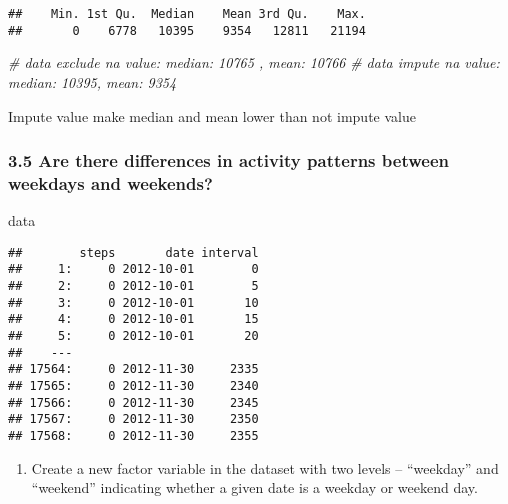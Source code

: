 \documentclass[
]{article}
\newenvironment{Shaded}{\begin{snugshade}}{\end{snugshade}}
\newcommand{\CommentTok}[1]{\textcolor[rgb]{0.56,0.35,0.01}{\textit{#1}}}
\newcommand{\KeywordTok}[1]{\textcolor[rgb]{0.13,0.29,0.53}{\textbf{#1}}}
\newcommand{\NormalTok}[1]{#1}
\newcommand{\OperatorTok}[1]{\textcolor[rgb]{0.81,0.36,0.00}{\textbf{#1}}}
\providecommand{\tightlist}{%
  \setlength{\itemsep}{0pt}\setlength{\parskip}{0pt}}
\begin{document}
\begin{Shaded}
\end{Shaded}

\begin{verbatim}
##    Min. 1st Qu.  Median    Mean 3rd Qu.    Max. 
##       0    6778   10395    9354   12811   21194
\end{verbatim}

\begin{Shaded}
\begin{Highlighting}[]
\CommentTok{# data exclude na value: median: 10765 , mean: 10766}
\CommentTok{# data impute na value: median: 10395, mean: 9354}
\end{Highlighting}
\end{Shaded}

Impute value make median and mean lower than not impute value

\hypertarget{are-there-differences-in-activity-patterns-between-weekdays-and-weekends}{%
\subsubsection{3.5 Are there differences in activity patterns between
weekdays and
weekends?}\label{are-there-differences-in-activity-patterns-between-weekdays-and-weekends}}

\begin{Shaded}
\begin{Highlighting}[]
\NormalTok{data}
\end{Highlighting}
\end{Shaded}

\begin{verbatim}
##        steps       date interval
##     1:     0 2012-10-01        0
##     2:     0 2012-10-01        5
##     3:     0 2012-10-01       10
##     4:     0 2012-10-01       15
##     5:     0 2012-10-01       20
##    ---                          
## 17564:     0 2012-11-30     2335
## 17565:     0 2012-11-30     2340
## 17566:     0 2012-11-30     2345
## 17567:     0 2012-11-30     2350
## 17568:     0 2012-11-30     2355
\end{verbatim}

\begin{enumerate}
\def\labelenumi{\arabic{enumi}.}
\tightlist
\item
  Create a new factor variable in the dataset with two levels --
  ``weekday'' and ``weekend'' indicating whether a given date is a
  weekday or weekend day.
\end{enumerate}
\end{document}
